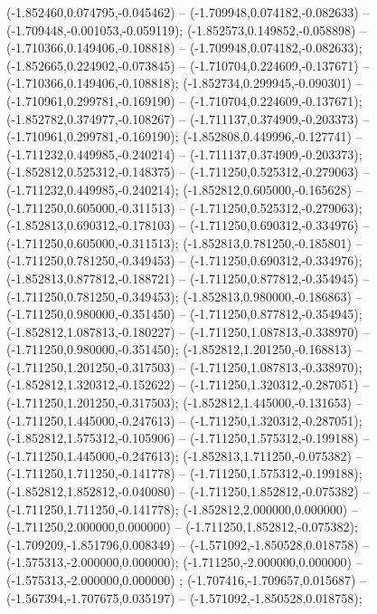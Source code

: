  (-1.852460,0.074795,-0.045462) -- (-1.709948,0.074182,-0.082633) -- (-1.709448,-0.001053,-0.059119);
 (-1.852573,0.149852,-0.058898) -- (-1.710366,0.149406,-0.108818) -- (-1.709948,0.074182,-0.082633);
 (-1.852665,0.224902,-0.073845) -- (-1.710704,0.224609,-0.137671) -- (-1.710366,0.149406,-0.108818);
 (-1.852734,0.299945,-0.090301) -- (-1.710961,0.299781,-0.169190) -- (-1.710704,0.224609,-0.137671);
 (-1.852782,0.374977,-0.108267) -- (-1.711137,0.374909,-0.203373) -- (-1.710961,0.299781,-0.169190);
 (-1.852808,0.449996,-0.127741) -- (-1.711232,0.449985,-0.240214) -- (-1.711137,0.374909,-0.203373);
 (-1.852812,0.525312,-0.148375) -- (-1.711250,0.525312,-0.279063) -- (-1.711232,0.449985,-0.240214);
 (-1.852812,0.605000,-0.165628) -- (-1.711250,0.605000,-0.311513) -- (-1.711250,0.525312,-0.279063);
 (-1.852813,0.690312,-0.178103) -- (-1.711250,0.690312,-0.334976) -- (-1.711250,0.605000,-0.311513);
 (-1.852813,0.781250,-0.185801) -- (-1.711250,0.781250,-0.349453) -- (-1.711250,0.690312,-0.334976);
 (-1.852813,0.877812,-0.188721) -- (-1.711250,0.877812,-0.354945) -- (-1.711250,0.781250,-0.349453);
 (-1.852813,0.980000,-0.186863) -- (-1.711250,0.980000,-0.351450) -- (-1.711250,0.877812,-0.354945);
 (-1.852812,1.087813,-0.180227) -- (-1.711250,1.087813,-0.338970) -- (-1.711250,0.980000,-0.351450);
 (-1.852812,1.201250,-0.168813) -- (-1.711250,1.201250,-0.317503) -- (-1.711250,1.087813,-0.338970);
 (-1.852812,1.320312,-0.152622) -- (-1.711250,1.320312,-0.287051) -- (-1.711250,1.201250,-0.317503);
 (-1.852812,1.445000,-0.131653) -- (-1.711250,1.445000,-0.247613) -- (-1.711250,1.320312,-0.287051);
 (-1.852812,1.575312,-0.105906) -- (-1.711250,1.575312,-0.199188) -- (-1.711250,1.445000,-0.247613);
 (-1.852813,1.711250,-0.075382) -- (-1.711250,1.711250,-0.141778) -- (-1.711250,1.575312,-0.199188);
 (-1.852812,1.852812,-0.040080) -- (-1.711250,1.852812,-0.075382) -- (-1.711250,1.711250,-0.141778);
 (-1.852812,2.000000,0.000000) -- (-1.711250,2.000000,0.000000) -- (-1.711250,1.852812,-0.075382);
 (-1.709209,-1.851796,0.008349) -- (-1.571092,-1.850528,0.018758) -- (-1.575313,-2.000000,0.000000);
 (-1.711250,-2.000000,0.000000) -- (-1.575313,-2.000000,0.000000) ;
 (-1.707416,-1.709657,0.015687) -- (-1.567394,-1.707675,0.035197) -- (-1.571092,-1.850528,0.018758);
